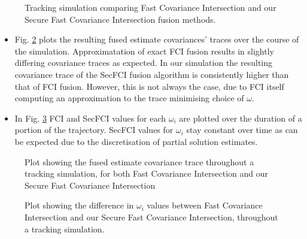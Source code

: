 \documentclass[letterpaper, 10 pt, conference]{ieeeconf}  %
\begin{document}
\begin{figure}[tb]
   \begin{center}
      
   \end{center}
   \caption{Tracking simulation comparing Fast Covariance Intersection and our Secure Fast Covariance Intersection fusion methods.}
   \label{fig:fci_secfci_traj}
\end{figure}

\begin{itemize}
   \item Fig. \ref{fig:fci_secfci_trace} plots the resulting fused estimate covariances' traces over the course of the simulation. Approximatation of exact FCI fusion results in slightly differing covariance traces as expected. In our simulation the resulting covariance trace of the SecFCI fusion algorithm is consistently higher than that of FCI fusion. However, this is not always the case, due to FCI itself computing an approximation to the trace minimising choice of $\omega$.
   \item In Fig. \ref{fig:fci_secfci_omegas} FCI and SecFCI values for each $\omega_i$ are plotted over the duration of a portion of the trajectory. SecFCI values for $\omega_i$ stay constant over time as can be expected due to the discretisation of partial solution estimates.
\end{itemize}

\begin{figure}[tb]
   \begin{center}
      
   \end{center}
   \caption{Plot showing the fused estimate covariance trace throughout a tracking simulation, for both Fast Covariance Intersection and our Secure Fast Covariance Intersection}
   \label{fig:fci_secfci_trace}
\end{figure}

\begin{figure}[tb]
   \begin{center}
      
   \end{center}
   \caption{Plot showing the difference in $\omega_i$ values between Fast Covariance Intersection and our Secure Fast Covariance Intersection, throughout a tracking simulation.}
   \label{fig:fci_secfci_omegas}
\end{figure}

\end{document}
